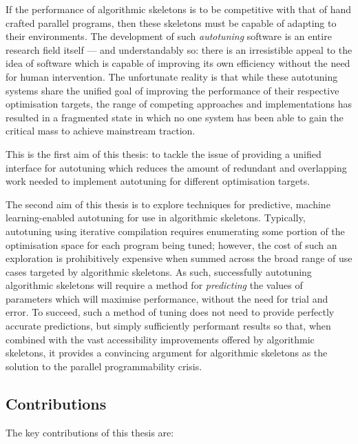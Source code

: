 \documentclass[nonatbib,preprint,11pt]{sigplanconf}
\begin{document}

If the performance of algorithmic skeletons is to be competitive with
that of hand crafted parallel programs, then these skeletons must be
capable of adapting to their environments. The development of such
\emph{autotuning} software is an entire research field itself --- and
understandably so: there is an irresistible appeal to the idea of
software which is capable of improving its own efficiency without the
need for human intervention. The unfortunate reality is that while
these autotuning systems share the unified goal of improving the
performance of their respective optimisation targets, the range of
competing approaches and implementations has resulted in a fragmented
state in which no one system has been able to gain the critical mass
to achieve mainstream traction.

This is the first aim of this thesis: to tackle the issue of providing
a unified interface for autotuning which reduces the amount of
redundant and overlapping work needed to implement autotuning for
different optimisation targets.


The second aim of this thesis is to explore techniques for predictive,
machine learning-enabled autotuning for use in algorithmic
skeletons. Typically, autotuning using iterative compilation requires
enumerating some portion of the optimisation space for each program
being tuned; however, the cost of such an exploration is prohibitively
expensive when summed across the broad range of use cases targeted by
algorithmic skeletons. As such, successfully autotuning algorithmic
skeletons will require a method for \emph{predicting} the values of
parameters which will maximise performance, without the need for trial
and error. To succeed, such a method of tuning does not need to
provide perfectly accurate predictions, but simply sufficiently
performant results so that, when combined with the vast accessibility
improvements offered by algorithmic skeletons, it provides a
convincing argument for algorithmic skeletons as the solution to the
parallel programmability crisis.


\subsection{Contributions}

The key contributions of this thesis are:
\end{document}
